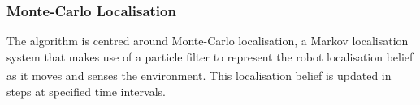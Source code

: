 \documentclass[11pt]{article}		%
\newcommand{\supercite}[1]{\textsuperscript{\cite{#1}}}		%
\begin{document}
		\subsubsection{Monte-Carlo Localisation}
		
	    The algorithm is centred around Monte-Carlo localisation, a Markov localisation system that makes use of a particle filter to represent the robot localisation belief as it moves and senses the environment\supercite{montecarlo}. This localisation belief is updated in steps at specified time intervals. 
        
\end{document}
